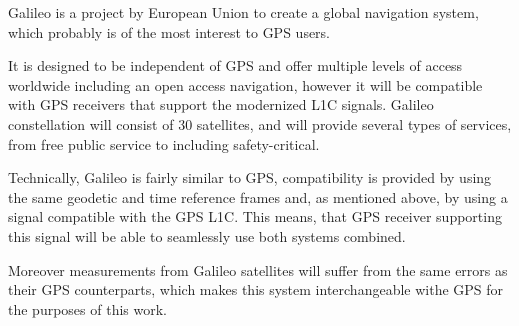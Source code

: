 Galileo \cite{galileo} is a project by European Union to create a global navigation system, which
probably is of the most interest to GPS users.

It is designed to be independent of GPS and offer multiple levels of access worldwide
including an open access navigation, however
it will be compatible with GPS receivers that support the modernized L1C signals.
Galileo constellation will consist of 30 satellites, and will provide several types of services,
from free public service to including safety-critical.

Technically, Galileo is fairly similar to GPS,
compatibility is provided by using the same geodetic and time reference frames
and, as mentioned above, by using a signal compatible with the GPS L1C.
This means, that GPS receiver supporting this signal will be able to seamlessly
use both systems combined.

Moreover measurements from Galileo satellites will suffer from the same errors as
their GPS counterparts, which makes this system interchangeable withe GPS for the purposes
of this work.
